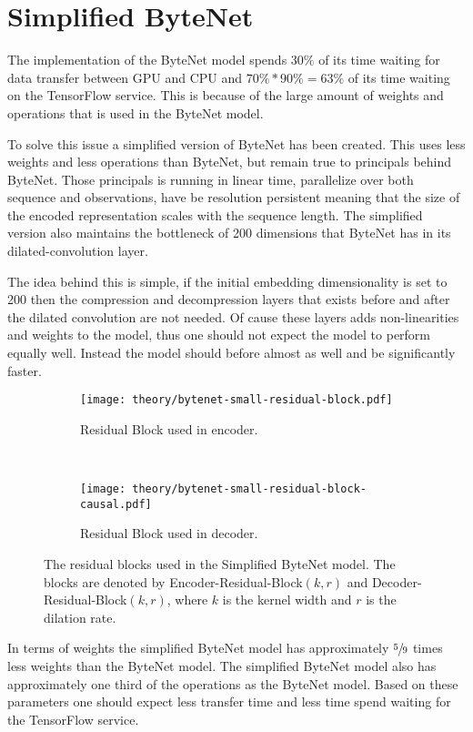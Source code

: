 \section{Simplified ByteNet}

The implementation of the ByteNet model spends $30\%$ of its time waiting for data transfer between GPU and CPU and $70\% * 90\% = 63\%$ of its time waiting on the TensorFlow service. This is because of the large amount of weights and operations that is used in the ByteNet model.

To solve this issue a simplified version of ByteNet has been created. This uses less weights and less operations than ByteNet, but remain true to principals behind ByteNet. Those principals is running in linear time, parallelize over both sequence and observations, have be resolution persistent meaning that the size of the encoded representation scales with the sequence length. The simplified version also maintains the bottleneck of 200 dimensions that ByteNet has in its dilated-convolution layer.

The idea behind this is simple, if the initial embedding dimensionality is set to 200 then the compression and decompression layers that exists before and after the dilated convolution are not needed. Of cause these layers adds non-linearities and weights to the model, thus one should not expect the model to perform equally well. Instead the model should before almost as well and be significantly faster.

\begin{figure}[H]
    \centering
    \begin{subfigure}[b]{0.45\textwidth}
        \centering
        \texttt{[image: theory/bytenet-small-residual-block.pdf]}
        \caption{Residual Block used in encoder.}
    \end{subfigure}
    ~ %
    \begin{subfigure}[b]{0.45\textwidth}
        \centering
        \texttt{[image: theory/bytenet-small-residual-block-causal.pdf]}
        \caption{Residual Block used in decoder.}
    \end{subfigure}
    \caption{The residual blocks used in the Simplified ByteNet model. The blocks are denoted by Encoder-Residual-Block$(k,r)$ and Decoder-Residual-Block$(k,r)$, where $k$ is the kernel width and $r$ is the dilation rate.}
    \label{fig:result:simple-bytenet:residual-block}
\end{figure}

In terms of weights the simplified ByteNet model has approximately $\sfrac{5}{9}$ times less weights than the ByteNet model. The simplified ByteNet model also has approximately one third of the operations as the ByteNet model. Based on these parameters one should expect less transfer time and less time spend waiting for the TensorFlow service.

